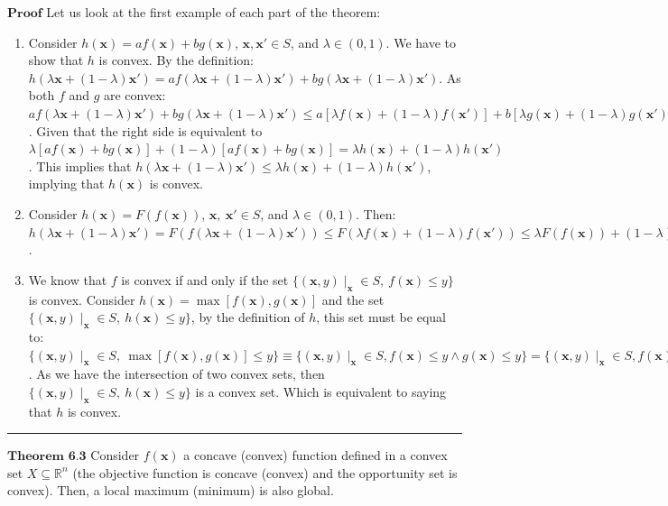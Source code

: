 \documentclass[0pt, a4paper]{article}
\begin{document}
$\textbf{Proof}$ Let us look at the first example of each part of the theorem:
\begin{enumerate}
	\item Consider $h(\textbf{x})=af(\textbf{x})+bg(\textbf{x})$, $\textbf{x},\textbf{x}'\in S$, and $\lambda\in(0,1)$. We have to show that $h$ is convex. By the definition: $h(\lambda\textbf{x}+(1-\lambda)\textbf{x}')=af(\lambda\textbf{x}+(1-\lambda)\textbf{x}')+bg(\lambda\textbf{x}+(1-\lambda)\textbf{x}')$. As both $f$ and $g$ are convex: $af(\lambda\textbf{x}+(1-\lambda)\textbf{x}')+bg(\lambda\textbf{x}+(1-\lambda)\textbf{x}')\leq a\left[\lambda f(\textbf{x})+(1-\lambda)f(\textbf{x}')\right]+b\left[\lambda g(\textbf{x})+(1-\lambda)g(\textbf{x}')\right]$. Given that the right side is equivalent to $\lambda\left[af(\textbf{x})+bg(\textbf{x})\right]+(1-\lambda)\left[af(\textbf{x})+bg(\textbf{x})\right]=\lambda h(\textbf{x})+(1-\lambda)h(\textbf{x}')$. This implies that $h(\lambda\textbf{x}+(1-\lambda)\textbf{x}')\leq\lambda h(\textbf{x})+(1-\lambda)h(\textbf{x}')$, implying that $h(\textbf{x})$ is convex.
	\item Consider $h(\textbf{x})=F(f(\textbf{x}))$, $\textbf{x},\ \textbf{x}'\in S$, and $\lambda\in(0,1)$. Then: $h(\lambda\textbf{x}+(1-\lambda)\textbf{x}')=F(f(\lambda\textbf{x}+(1-\lambda)\textbf{x}'))\leq F(\lambda f(\textbf{x})+(1-\lambda)f(\textbf{x}'))\leq \lambda F( f(\textbf{x})) + (1-\lambda)F(f(\textbf{x}'))=\lambda h(\textbf{x})+(1-\lambda)h(\textbf{x}')$.
	\item We know that $f$ is convex if and only if the set $\{(\textbf{x},y)\mid_\textbf{x}\in S,\ f(\textbf{x})\leq y\}$ is convex. Consider $h(\textbf{x})=\max\left[f(\textbf{x}),g(\textbf{x})\right]$ and the set $\{(\textbf{x},y)\mid_\textbf{x}\in S,\ h(\textbf{x})\leq y\}$, by the definition of $h$, this set must be equal to: $\{(\textbf{x},y)\mid_\textbf{x}\in S,\ \max\left[f(\textbf{x}),g(\textbf{x})\right]\leq y\}\equiv\{(\textbf{x},y)\mid_\textbf{x}\in S, f(\textbf{x})\leq y\wedge g(\textbf{x})\leq y\}=\{(\textbf{x},y)\mid_\textbf{x}\in S, f(\textbf{x})\leq y\}\cap\{(\textbf{x},y)\mid_\textbf{x}\in S, g(\textbf{x})\leq y\}$. As we have the intersection of two convex sets, then $\{(\textbf{x},y)\mid_\textbf{x}\in S,\ h(\textbf{x})\leq y\}$ is a convex set. Which is equivalent to saying that $h$ is convex.
\end{enumerate}

\noindent\rule{\textwidth}{1pt}

$\textbf{Theorem 6.3}$ Consider $f(\textbf{x})$ a concave (convex) function defined in a convex set $X\subseteq\mathbb{R}^n$ (the objective function is concave (convex) and the opportunity set is convex). Then, a local maximum (minimum) is also global.
\end{document}
